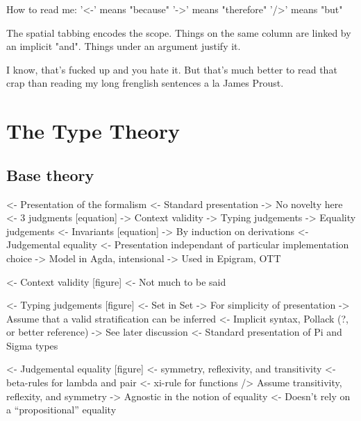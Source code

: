 \documentclass{article}
\newenvironment{structure}{\footnotesize\verbatim}{\endverbatim}
\begin{document}
\begin{structure}
How to read me:
    '<-'  means "because"
    '->'  means "therefore"
    '/>'  means "but"

The spatial tabbing encodes the scope. Things on the same column are
linked by an implicit "and". Things under an argument justify it.

I know, that's fucked up and you hate it. But that's much better to
read that crap than reading my long frenglish sentences a la James
Proust.
\end{structure}

\section{The Type Theory}

\subsection{Base theory}

\begin{structure}
<- Presentation of the formalism
    <- Standard presentation
        -> No novelty here
    <- 3 judgments [equation]
        -> Context validity
        -> Typing judgements
        -> Equality judgements
    <- Invariants [equation]
        -> By induction on derivations
    <- Judgemental equality
        <- Presentation independant of particular implementation choice
        -> Model in Agda, intensional
        -> Used in Epigram, OTT
\end{structure}

\begin{structure}
<- Context validity [figure]
    <- Not much to be said
\end{structure}

\begin{structure}
<- Typing judgements [figure]
    <- Set in Set
        -> For simplicity of presentation
        -> Assume that a valid stratification can be inferred
            <- Implicit syntax, Pollack (?, or better reference)
        -> See later discussion
    <- Standard presentation of Pi and Sigma types
\end{structure}

\begin{structure}
<- Judgemental equality [figure]
    <- symmetry, reflexivity, and transitivity
    <- beta-rules for lambda and pair
    <- xi-rule for functions
    /> Assume transitivity, reflexity, and symmetry
    -> Agnostic in the notion of equality
        <- Doesn't rely on a ``propositional'' equality
\end{structure}
\end{document}
